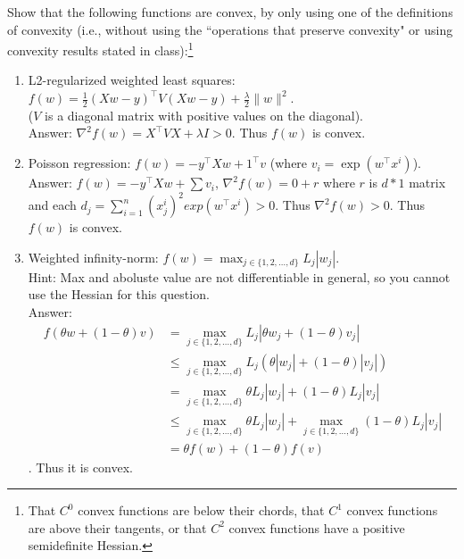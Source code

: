 \documentclass{article}
\def\blu#1{{\color{blu}#1}}
\def\gre#1{{\color{gre}#1}}
\def\norm#1{\|#1\|}
\def\half{\frac 1 2}
\def\enum#1{\begin{enumerate}#1\end{enumerate}}
\begin{document}
\blu{Show that the following functions are convex, by only using one of the definitions of convexity (i.e., without using the ``operations that preserve convexity" or using convexity results stated in class)}:\footnote{That $C^0$ convex functions are below their chords, that $C^1$ convex functions are above their tangents, or that $C^2$ convex functions have a positive semidefinite Hessian.}
\enum{
\item L2-regularized weighted least squares: $f(w) = \half(Xw - y)^\top V(Xw-y)  + \frac \lambda 2 \norm{w}^2$.\\($V$ is a diagonal matrix with positive values on the diagonal).
\gre{
\\ Answer: $\nabla ^2 f(w) = X^\top VX + \lambda I>0$. Thus $f(w)$ is convex.
}
\item Poisson regression: $f(w) = -y^\top Xw + 1^\top v$ (where $v_i = \exp(w^\top x^i)$).
\gre{
\\ Answer: $f(w) =  -y^\top Xw + \sum v_i$, $\nabla^2f(w) = 0 + r$ where $r$ is $d*1$ matrix and each $d_j = \sum_{i=1}^n (x_j^i)^2exp(w^\top x^i)>0$. Thus $\nabla^2f(w)>0$. Thus $f(w)$ is convex.
}
\item Weighted infinity-norm: $f(w) = \max_{j \in \{1,2,\dots,d\}}L_j|w_j|$.\\
Hint: Max and aboluste value are not differentiable in general, so you cannot use the Hessian for this question.
\gre{
\\ Answer: \begin{align*}
f(\theta w+(1-\theta)v) &= \max_{j \in \{1,2,\dots,d\}} L_j|\theta w_j +(1-\theta) v_j|\\ &\leq \max_{j \in \{1,2,\dots,d\}} L_j(\theta | w_j |+(1-\theta) |v_j|)\\ &= \max_{j \in \{1,2,\dots,d\}} \theta L_j | w_j |+(1-\theta) L_j |v_j|\\ &\leq \max_{j \in \{1,2,\dots,d\}} \theta L_j | w_j |+\max_{j \in \{1,2,\dots,d\}}(1-\theta) L_j |v_j|\\ &= \theta f(w) +(1-\theta) f(v) 
\end{align*}. Thus it is convex.
}
}
\end{document}
